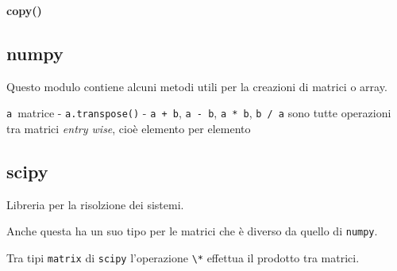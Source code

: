\textbf{copy()}


\subsection{numpy}\label{numpy}

%

Questo modulo contiene alcuni metodi utili per la creazioni di matrici o
array.

\texttt{a}~matrice - \texttt{a.transpose()} - \texttt{a\ +\ b},
\texttt{a\ -\ b}, \texttt{a\ *\ b}, \texttt{b\ /\ a} sono tutte
operazioni tra matrici \emph{entry wise}, cioè elemento per elemento

\subsection{scipy}\label{scipy}


Libreria per la risolzione dei sistemi.

Anche questa ha un suo tipo per le matrici che è diverso da quello di
\texttt{numpy}.

Tra tipi \texttt{matrix} di \texttt{scipy} l'operazione
\texttt{\textbackslash{}*} effettua il prodotto tra matrici.
